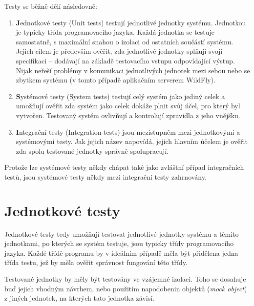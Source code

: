 Testy se běžně dělí následovně: \cite{testsTypes}\cite{ivsTest}

\begin{enumerate}
  
  \item {\textbf Jednotkové testy (Unit tests)} testují jednotlivé jednotky systému. Jednotkou je typicky třída programovacího jazyka. Každá jednotka se testuje samostatně, s maximální snahou o izolaci od ostatních součástí systému. Jejich cílem je především ověřit, zda jednotlivé jednotky splňují svoji specifikaci -- dodávají na základě testovacího vstupu odpovídající výstup. Nijak neřeší problémy v komunikaci jednotlivých jednotek mezi sebou nebo se zbytkem systému (v tomto případě aplikačním serverem WildFly). \cite{testsTypes}\cite{ivsTest}
  
  \item {\textbf Systémové testy (System tests)} testují celý systém jako jediný celek a umožňují ověřit zda systém jako celek dokáže plnit svůj účel, pro který byl vytvořen. Testovaný systém ovlivňují a kontrolují zpravidla z jeho vnějšku. \cite{testsTypes}\cite{ivsTest}
  
  \item {\textbf Integrační testy (Integration tests)} jsou mezistupněm mezi jednotkovými a systémovými testy. Jak jejich název napovídá, jejich hlavním účelem je ověřit zda spolu testované jednotky správně spolupracují. \cite{testsTypes}\cite{ivsTest}
  
\end{enumerate}

Protože lze systémové testy někdy chápat také jako zvláštní případ integračních testů, jsou systémové testy někdy mezi integrační testy zahrnovány. \cite{testsUnitVsInteg}

\section{Jednotkové testy}

Jednotkové testy tedy umožňují testovat jednotlivé jednotky systému a těmito jednotkami, po kterých se systém testuje, jsou typicky třídy programovacího jazyka. Každé třídě programu by v ideálním případě měla být přidělena jedna třída testu, jež by měla ověřit správnost fungování této třídy.

Testované jednotky by měly být testovány ve vzájemné izolaci. Toho se dosahuje buď jejich vhodným návrhem, nebo použitím napodobenin objektů ({\it mock object}) z jiných jednotek, na kterých tato jednotka závisí.

